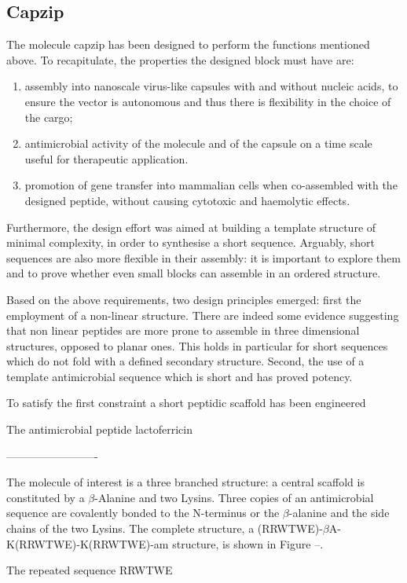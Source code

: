 \subsection{Capzip}
The molecule capzip has been designed to perform the functions mentioned above. To recapitulate, the properties the designed block must have are:
\begin{enumerate}
\item assembly into nanoscale virus-like capsules with and without nucleic acids, to ensure the vector is autonomous and thus there is flexibility in the choice of the cargo;
\item antimicrobial activity of the molecule and of the capsule on a time scale useful for therapeutic application.
\item promotion of gene transfer into mammalian cells when co-assembled with the designed peptide, without causing cytotoxic and haemolytic effects.
\end{enumerate}
%
Furthermore, the design effort was aimed at building a template structure of minimal complexity, in order to synthesise a short sequence. Arguably, short sequences are also more flexible in their assembly: it is important to explore them and to prove whether even small blocks can assemble in an ordered structure.

Based on the above requirements, two design principles emerged: first the employment of a non-linear structure. There are indeed some evidence suggesting that non linear peptides are more prone to assemble in three dimensional structures, opposed to planar ones. This holds in particular for short sequences which do not fold with a defined secondary structure. Second, the use of a template antimicrobial sequence which is short and has proved potency.

To satisfy the first constraint a short peptidic scaffold has been engineered

The antimicrobial peptide lactoferricin

-------------------------

The molecule of interest is a three branched structure: a central scaffold is constituted by a $\beta$-Alanine and two Lysins. Three copies of an antimicrobial sequence are covalently bonded to the N-terminus or the $\beta$-alanine and the side chains of the two Lysins. The complete structure, a (RRWTWE)-$\beta$A-K(RRWTWE)-K(RRWTWE)-am structure, is shown in Figure --.

The repeated sequence RRWTWE

